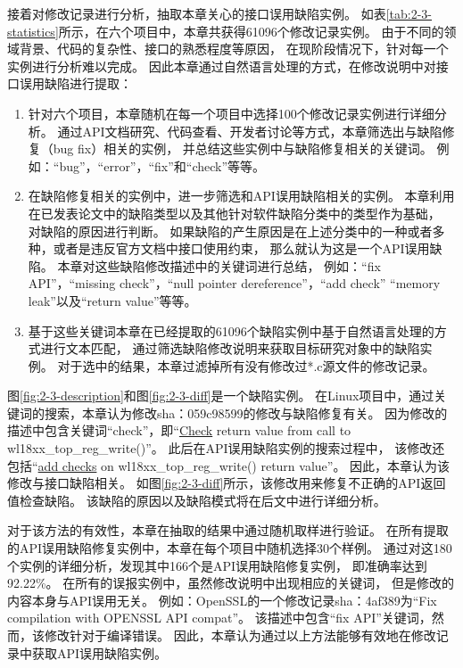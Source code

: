 接着对修改记录进行分析，抽取本章关心的接口误用缺陷实例。
如表\ref{tab:2-3-statistics}所示，在六个项目中，本章共获得61096个修改记录实例。
由于不同的领域背景、代码的复杂性、接口的熟悉程度等原因，
在现阶段情况下，针对每一个实例进行分析难以完成。
因此本章通过自然语言处理的方式，在修改说明中对接口误用缺陷进行提取：
\begin{enumerate}
	\item 针对六个项目，本章随机在每一个项目中选择100个修改记录实例进行详细分析。
	通过API文档研究、代码查看、开发者讨论等方式，本章筛选出与缺陷修复（bug fix）相关的实例，
	并总结这些实例中与缺陷修复相关的关键词。
	例如：“bug”，“error”，“fix”和“check”等等。
	\item 在缺陷修复相关的实例中，进一步筛选和API误用缺陷相关的实例。
	本章利用在已发表论文中的缺陷类型以及其他针对软件缺陷分类中的类型作为基础，
	对缺陷的原因进行判断。
	如果缺陷的产生原因是在上述分类中的一种或者多种，或者是违反官方文档中接口使用约束，
	那么就认为这是一个API误用缺陷。
	本章对这些缺陷修改描述中的关键词进行总结，
	例如：“fix API”，“missing check”，“null pointer dereference”，“add check” “memory leak”以及“return value”等等。
	\item 基于这些关键词本章在已经提取的61096个缺陷实例中基于自然语言处理的方式进行文本匹配，
	通过筛选缺陷修改说明来获取目标研究对象中的缺陷实例。
	对于选中的结果，本章过滤掉所有没有修改过*.c源文件的修改记录。
\end{enumerate}

图\ref{fig:2-3-description}和图\ref{fig:2-3-diff}是一个缺陷实例。
在Linux项目中，通过关键词的搜索，本章认为修改sha：059c98599的修改与缺陷修复有关。
因为修改的描述中包含关键词“check”，即“\underline{Check} return value from call to wl18xx\_top\_reg\_write()”。
此后在API误用缺陷实例的搜索过程中，
该修改还包括“\underline{add checks} on wl18xx\_top\_reg\_write() return value”。
因此，本章认为该修改与接口缺陷相关。
如图\ref{fig:2-3-diff}所示，该修改用来修复不正确的API返回值检查缺陷。
该缺陷的原因以及缺陷模式将在后文中进行详细分析。

对于该方法的有效性，本章在抽取的结果中通过随机取样进行验证。
在所有提取的API误用缺陷修复实例中，本章在每个项目中随机选择30个样例。
通过对这180个实例的详细分析，发现其中166个是API误用缺陷修复实例，
即准确率达到92.22\%。
在所有的误报实例中，虽然修改说明中出现相应的关键词，
但是修改的内容本身与API误用无关。
例如：OpenSSL的一个修改记录sha：4af389为“Fix compilation with OPENSSL API compat”。
该描述中包含“fix API”关键词，然而，该修改针对于编译错误。
因此，本章认为通过以上方法能够有效地在修改记录中获取API误用缺陷实例。

